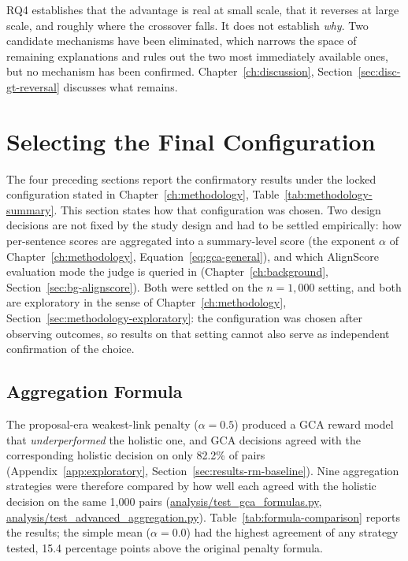 \begin{caveat}
RQ4 establishes that the advantage is real at small scale, that it
reverses at large scale, and roughly where the crossover falls. It does
not establish \emph{why}. Two candidate mechanisms have been eliminated,
which narrows the space of remaining explanations and rules out the two
most immediately available ones, but no mechanism has been confirmed.
Chapter~\ref{ch:discussion}, Section~\ref{sec:disc-gt-reversal} discusses
what remains.
\end{caveat}

\section{Selecting the Final Configuration}
\label{sec:results-config-selection}

The four preceding sections report the confirmatory results under the locked
configuration stated in Chapter~\ref{ch:methodology},
Table~\ref{tab:methodology-summary}. This section states how that
configuration was chosen. Two design decisions are not fixed by the study
design and had to be settled empirically: how per-sentence scores are
aggregated into a summary-level score
(the exponent $\alpha$ of Chapter~\ref{ch:methodology},
Equation~\ref{eq:gca-general}), and which AlignScore evaluation mode the judge
is queried in (Chapter~\ref{ch:background}, Section~\ref{sec:bg-alignscore}).
Both were settled on the $n=1{,}000$ setting, and both are exploratory in the
sense of Chapter~\ref{ch:methodology}, Section~\ref{sec:methodology-exploratory}:
the configuration was chosen after observing outcomes, so results on that
setting cannot also serve as independent confirmation of the choice.

\subsection{Aggregation Formula}
\label{sec:results-formula-opt}

The proposal-era weakest-link penalty ($\alpha=0.5$) produced a GCA reward model
that \emph{underperformed} the holistic one, and GCA decisions agreed with the
corresponding holistic decision on only 82.2\% of pairs
(Appendix~\ref{app:exploratory}, Section~\ref{sec:results-rm-baseline}). Nine
aggregation strategies were therefore compared by how well each agreed with the
holistic decision on the same 1{,}000 pairs
(\url{analysis/test_gca_formulas.py}, \url{analysis/test_advanced_aggregation.py}).
Table~\ref{tab:formula-comparison} reports the results; the simple mean
($\alpha=0.0$) had the highest agreement of any strategy tested, 15.4
percentage points above the original penalty formula.

